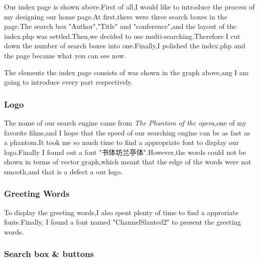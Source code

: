 \documentclass[10pt,twoside,a4paper,titlepage]{article}
\begin{document}
		Our index page is shown above.First of all,I would like to introduce the process of my designing our home page.At first,there were three search boxes in the page.The search box "Author","Title" and "conference",and the layout of the index.php was settled.Then,we decided to use multi-searching.Therefore I cut down the number of search boxes into one.Finally,I polished the index.php and the page became what you can see now.
		
		The elements the index page consists of was shown in the graph above,ang I am going to introduce every part respectively.
		
		\subsubsection{Logo}
		
		The name of our search engine came from \emph{The Phantom of the opera},one of my favorite films,and I hope that the speed of our searching engine can be as fast as a phantom.It took me so much time to find a appropriate font to display our logo.Finally I found out a font "书体坊兰亭体".However,the words could not be shown in terms of vector graph,which meant that the edge of the words were not smooth,and that is a defect a our logo.
		
		\subsubsection{Greeting Words}
		
		To display the greeting words,I also spent plenty of time to find a approriate fonts.Finally, I found a font named "ChannelSlanted2" to present the greeting words.
		
		\subsubsection{Search box \& buttons}
		
\end{document}

